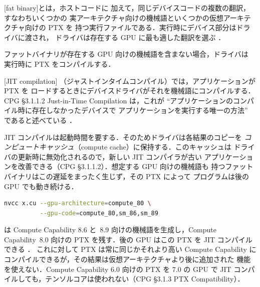 \documentclass[../main.tex]{subfiles}
\begin{document}
\begin{definition}[ファットバイナリ]
  [fat binary]とは，ホストコードに
  加えて，同じデバイスコードの複数の翻訳，すなわちいくつかの
  実アーキテクチャ向けの機械語といくつかの仮想アーキテクチャ向けの PTX を
  持つ実行ファイルである．実行時にデバイス部分はドライバに渡され，
  ドライバは存在する GPU に最も適した翻訳を選ぶ
  \cite[§5.6.2]{nvidia2026nvcc}．
\end{definition}

ファットバイナリが存在する GPU 向けの機械語を含まない場合，ドライバは
実行時に PTX をコンパイルする．

\begin{definition}
  [JIT compilation]
  （ジャストインタイムコンパイル）では，アプリケーションが PTX を
  ロードするときにデバイスドライバがそれを機械語にコンパイルする．
  CPG §3.1.1.2 Just-in-Time Compilation は，これが
  \enquote{アプリケーションのコンパイル時に存在しなかったデバイスで
  アプリケーションを実行する唯一の方法} であると述べている
  \cite{nvidia2024cudaguide}．
\end{definition}

JIT コンパイルは起動時間を要する．そのためドライバは各結果のコピーを
\emph{コンピュートキャッシュ}（compute cache）に保持する．このキャッシュは
ドライバの更新時に無効化されるので，新しい JIT コンパイラが古い
アプリケーションを改善できる（CPG §3.1.1.2）．想定する GPU 向けの機械語も
持つファットバイナリはこの遅延をまったく生じず，その PTX によって
プログラムは後の GPU でも動き続ける．
\begin{lstlisting}[language=bash, numbers=none]
nvcc x.cu --gpu-architecture=compute_80 \
          --gpu-code=compute_80,sm_86,sm_89
\end{lstlisting}
は Compute Capability 8.6 と~8.9 向けの機械語を生成し，Compute
Capability~8.0 向けの PTX を残す．後の GPU はこの PTX を JIT
コンパイルできる \cite[§5.6.2]{nvidia2026nvcc}．
これに対して PTX は常に同じかそれより高い Compute Capability に
コンパイルできるが，その結果は仮想アーキテクチャより後に追加された
機能を使えない．Compute Capability 6.0 向けの PTX を 7.0 の GPU で
JIT コンパイルしても，テンソルコアは使われない（CPG §3.1.3 PTX
Compatibility）．
\end{document}
